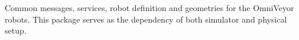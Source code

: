 Common messages, services, robot definition and geometries for the Omni\+Veyor robots. This package serves as the dependency of both simulator and physical setup. 